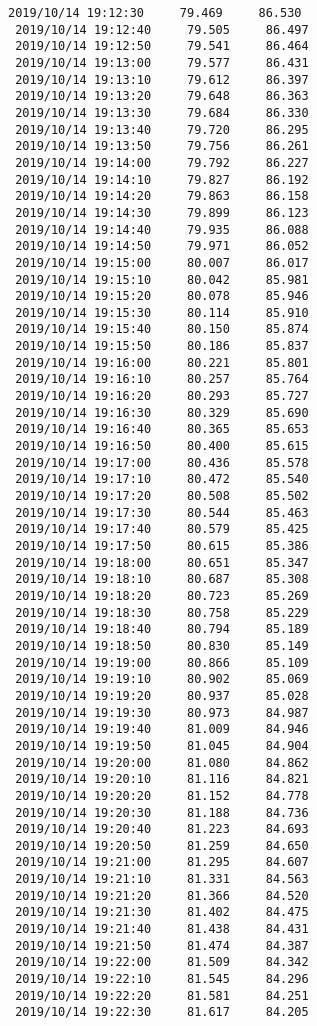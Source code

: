 \documentclass[11pt]{article}
\begin{document}
\begin{Verbatim}[commandchars=\\\{\}]
 2019/10/14 19:12:30     79.469     86.530
 2019/10/14 19:12:40     79.505     86.497
 2019/10/14 19:12:50     79.541     86.464
 2019/10/14 19:13:00     79.577     86.431
 2019/10/14 19:13:10     79.612     86.397
 2019/10/14 19:13:20     79.648     86.363
 2019/10/14 19:13:30     79.684     86.330
 2019/10/14 19:13:40     79.720     86.295
 2019/10/14 19:13:50     79.756     86.261
 2019/10/14 19:14:00     79.792     86.227
 2019/10/14 19:14:10     79.827     86.192
 2019/10/14 19:14:20     79.863     86.158
 2019/10/14 19:14:30     79.899     86.123
 2019/10/14 19:14:40     79.935     86.088
 2019/10/14 19:14:50     79.971     86.052
 2019/10/14 19:15:00     80.007     86.017
 2019/10/14 19:15:10     80.042     85.981
 2019/10/14 19:15:20     80.078     85.946
 2019/10/14 19:15:30     80.114     85.910
 2019/10/14 19:15:40     80.150     85.874
 2019/10/14 19:15:50     80.186     85.837
 2019/10/14 19:16:00     80.221     85.801
 2019/10/14 19:16:10     80.257     85.764
 2019/10/14 19:16:20     80.293     85.727
 2019/10/14 19:16:30     80.329     85.690
 2019/10/14 19:16:40     80.365     85.653
 2019/10/14 19:16:50     80.400     85.615
 2019/10/14 19:17:00     80.436     85.578
 2019/10/14 19:17:10     80.472     85.540
 2019/10/14 19:17:20     80.508     85.502
 2019/10/14 19:17:30     80.544     85.463
 2019/10/14 19:17:40     80.579     85.425
 2019/10/14 19:17:50     80.615     85.386
 2019/10/14 19:18:00     80.651     85.347
 2019/10/14 19:18:10     80.687     85.308
 2019/10/14 19:18:20     80.723     85.269
 2019/10/14 19:18:30     80.758     85.229
 2019/10/14 19:18:40     80.794     85.189
 2019/10/14 19:18:50     80.830     85.149
 2019/10/14 19:19:00     80.866     85.109
 2019/10/14 19:19:10     80.902     85.069
 2019/10/14 19:19:20     80.937     85.028
 2019/10/14 19:19:30     80.973     84.987
 2019/10/14 19:19:40     81.009     84.946
 2019/10/14 19:19:50     81.045     84.904
 2019/10/14 19:20:00     81.080     84.862
 2019/10/14 19:20:10     81.116     84.821
 2019/10/14 19:20:20     81.152     84.778
 2019/10/14 19:20:30     81.188     84.736
 2019/10/14 19:20:40     81.223     84.693
 2019/10/14 19:20:50     81.259     84.650
 2019/10/14 19:21:00     81.295     84.607
 2019/10/14 19:21:10     81.331     84.563
 2019/10/14 19:21:20     81.366     84.520
 2019/10/14 19:21:30     81.402     84.475
 2019/10/14 19:21:40     81.438     84.431
 2019/10/14 19:21:50     81.474     84.387
 2019/10/14 19:22:00     81.509     84.342
 2019/10/14 19:22:10     81.545     84.296
 2019/10/14 19:22:20     81.581     84.251
 2019/10/14 19:22:30     81.617     84.205

\end{Verbatim}
\end{document}
